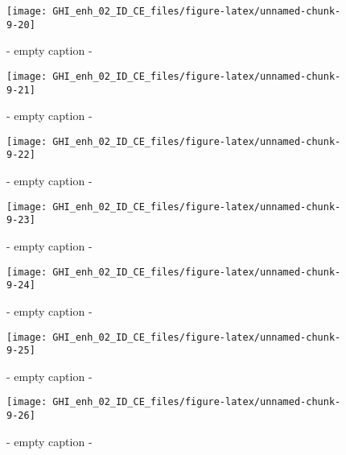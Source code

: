 \documentclass[
  10pt,
  a4paper,oneside]{article}
\begin{document}
\begin{figure}[H]

{\centering \texttt{[image: GHI\_enh\_02\_ID\_CE\_files/figure-latex/unnamed-chunk-9-20]} 

}

\caption{ - empty caption - }\label{fig:unnamed-chunk-9-20}
\end{figure}
\begin{figure}[H]

{\centering \texttt{[image: GHI\_enh\_02\_ID\_CE\_files/figure-latex/unnamed-chunk-9-21]} 

}

\caption{ - empty caption - }\label{fig:unnamed-chunk-9-21}
\end{figure}
\begin{figure}[H]

{\centering \texttt{[image: GHI\_enh\_02\_ID\_CE\_files/figure-latex/unnamed-chunk-9-22]} 

}

\caption{ - empty caption - }\label{fig:unnamed-chunk-9-22}
\end{figure}
\begin{figure}[H]

{\centering \texttt{[image: GHI\_enh\_02\_ID\_CE\_files/figure-latex/unnamed-chunk-9-23]} 

}

\caption{ - empty caption - }\label{fig:unnamed-chunk-9-23}
\end{figure}
\begin{figure}[H]

{\centering \texttt{[image: GHI\_enh\_02\_ID\_CE\_files/figure-latex/unnamed-chunk-9-24]} 

}

\caption{ - empty caption - }\label{fig:unnamed-chunk-9-24}
\end{figure}
\begin{figure}[H]

{\centering \texttt{[image: GHI\_enh\_02\_ID\_CE\_files/figure-latex/unnamed-chunk-9-25]} 

}

\caption{ - empty caption - }\label{fig:unnamed-chunk-9-25}
\end{figure}
\begin{figure}[H]

{\centering \texttt{[image: GHI\_enh\_02\_ID\_CE\_files/figure-latex/unnamed-chunk-9-26]} 

}

\caption{ - empty caption - }\label{fig:unnamed-chunk-9-26}
\end{figure}
\end{document}
